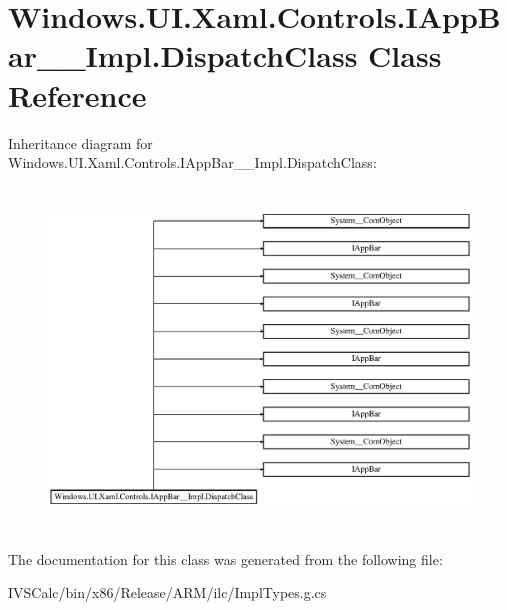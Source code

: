 \hypertarget{class_windows_1_1_u_i_1_1_xaml_1_1_controls_1_1_i_app_bar_____impl_1_1_dispatch_class}{}\section{Windows.\+U\+I.\+Xaml.\+Controls.\+I\+App\+Bar\+\_\+\+\_\+\+Impl.\+Dispatch\+Class Class Reference}
\label{class_windows_1_1_u_i_1_1_xaml_1_1_controls_1_1_i_app_bar_____impl_1_1_dispatch_class}
Inheritance diagram for Windows.\+U\+I.\+Xaml.\+Controls.\+I\+App\+Bar\+\_\+\+\_\+\+Impl.\+Dispatch\+Class\+:\begin{figure}[H]
\begin{center}
\leavevmode
\includegraphics[height=9.112427cm]{class_windows_1_1_u_i_1_1_xaml_1_1_controls_1_1_i_app_bar_____impl_1_1_dispatch_class}
\end{center}
\end{figure}


The documentation for this class was generated from the following file\+:\begin{DoxyCompactItemize}
\item 
I\+V\+S\+Calc/bin/x86/\+Release/\+A\+R\+M/ilc/Impl\+Types.\+g.\+cs\end{DoxyCompactItemize}
